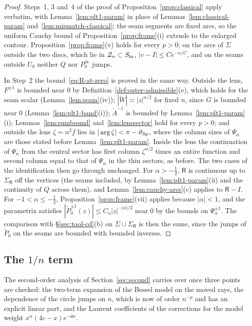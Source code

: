 \begin{proof}
Steps~1, 3 and~4 of the proof of Proposition~\ref{prop:classical} apply verbatim, with Lemma~\ref{lem:plt1-param} in
place of Lemmas~\ref{lem:classical-param} and~\ref{lem:mismatch-classical}; the seam segments are fixed arcs, so the
uniform Cauchy bound of Proposition~\ref{prop:frame}(i) extends to the enlarged contour. Proposition~\ref{prop:frame}(v)
holds for every $p>0$; on the arcs of $\Sigma$ outside the two discs, which lie in $\mathcal{Z}_n\subset S_{\mathrm{in}}$, $|v-I|\le Ce^{-n/C}$,
and on the seams outside $U_0$ neither $Q$ nor $P^\infty_0$ jumps.

In Step~2 the bound~\eqref{eq:R-at-zero} is proved in the same way. Outside the lens, $F^{\pm1}$ is bounded near $0$ by
Definition~\ref{def:outer-admissible}(e), which holds for the seam scalar (Lemma~\ref{lem:seam}(iv)); $|\tilde W|\asymp|z|^{\alpha/2}$
for fixed $n$, since $G$ is bounded near $0$ (Lemma~\ref{lem:plt1-band}(i)); $\check A^{-1}$ is bounded by
Lemma~\ref{lem:plt1-param}(i); Lemmas~\ref{lem:sumbound} and~\ref{lem:lenssector} hold for every $p>0$; and outside the
lens $\zeta=n^2f$ lies in $|\arg\zeta|<\pi-\vartheta_{\mathrm{lip}}$, where the column sizes of $\Psi_\alpha$ are those stated before
Lemma~\ref{lem:plt1-param}. Inside the lens the continuation of $\Psi_\alpha$ from the central sector has first column
$\zeta^{\alpha/2}$ times an entire function and second column equal to that of $\Psi_\alpha$ in the thin sectors, as
before. The two cases of the identification then go through unchanged. For $\alpha>-\frac12$, $\mathsf R$ is continuous up
to $\Sigma_{\mathsf R}$ off the vertices (the seams included, by Lemma~\ref{lem:plt1-param}(ii) and the continuity of $Q$
across them), and Lemma~\ref{lem:cauchy-arcs}(c) applies to $\mathsf R-I$. For $-1<\alpha\le-\frac12$,
Proposition~\ref{prop:frame}(vii) applies because $|\alpha|<1$, and the parametrix satisfies
$|\check P_0^{\pm1}(z)|\le C_n|z|^{-|\alpha|/2}$ near $0$ by the bounds on $\Psi_\alpha^{\pm1}$. The comparison with
\S\ref{sec:tool-cd}(b) on $\Sigma\cup\Sigma_{\mathsf R}$ is then the same, since the jumps of $\check P_0$ on the seams are
bounded with bounded inverses.
\end{proof}

\subsection{\texorpdfstring{The $1/n$ term}{The 1/n term}}\label{sec:plt1-second}

The second-order analysis of Section~\ref{sec:second} carries over once three points are checked: the two-term
expansion of the Bessel model on the moved rays, the dependence of the circle jumps on $n$, which is now of order
$n^{-p}$ and has an explicit linear part, and the Laurent coefficients of the corrections for the model weight
$x^\alpha(4c-x)e^{-\mathsf dx}$.

